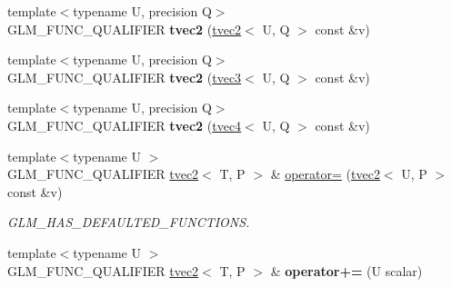 \begin{DoxyCompactItemize}
\item 
\hypertarget{structglm_1_1tvec2_a2d50495ed375c14e7dadde4dc3de82ba}{{\footnotesize template$<$typename U, precision Q$>$ }\\G\-L\-M\-\_\-\-F\-U\-N\-C\-\_\-\-Q\-U\-A\-L\-I\-F\-I\-E\-R {\bfseries tvec2} (\hyperlink{structglm_1_1tvec2}{tvec2}$<$ U, Q $>$ const \&v)}\label{structglm_1_1tvec2_a2d50495ed375c14e7dadde4dc3de82ba}

\item 
\hypertarget{structglm_1_1tvec2_a9742902fc6686c11ae142a5bbc8b9c58}{{\footnotesize template$<$typename U, precision Q$>$ }\\G\-L\-M\-\_\-\-F\-U\-N\-C\-\_\-\-Q\-U\-A\-L\-I\-F\-I\-E\-R {\bfseries tvec2} (\hyperlink{structglm_1_1tvec3}{tvec3}$<$ U, Q $>$ const \&v)}\label{structglm_1_1tvec2_a9742902fc6686c11ae142a5bbc8b9c58}

\item 
\hypertarget{structglm_1_1tvec2_abd8dda4cd25f53c5fcf6565f9689e1a4}{{\footnotesize template$<$typename U, precision Q$>$ }\\G\-L\-M\-\_\-\-F\-U\-N\-C\-\_\-\-Q\-U\-A\-L\-I\-F\-I\-E\-R {\bfseries tvec2} (\hyperlink{structglm_1_1tvec4}{tvec4}$<$ U, Q $>$ const \&v)}\label{structglm_1_1tvec2_abd8dda4cd25f53c5fcf6565f9689e1a4}

\item 
\hypertarget{structglm_1_1tvec2_af214e66acab4db6f5a539ff9a161e3ba}{{\footnotesize template$<$typename U $>$ }\\G\-L\-M\-\_\-\-F\-U\-N\-C\-\_\-\-Q\-U\-A\-L\-I\-F\-I\-E\-R \hyperlink{structglm_1_1tvec2}{tvec2}$<$ T, P $>$ \& \hyperlink{structglm_1_1tvec2_af214e66acab4db6f5a539ff9a161e3ba}{operator=} (\hyperlink{structglm_1_1tvec2}{tvec2}$<$ U, P $>$ const \&v)}\label{structglm_1_1tvec2_af214e66acab4db6f5a539ff9a161e3ba}

\begin{DoxyCompactList}\small\item\em G\-L\-M\-\_\-\-H\-A\-S\-\_\-\-D\-E\-F\-A\-U\-L\-T\-E\-D\-\_\-\-F\-U\-N\-C\-T\-I\-O\-N\-S. \end{DoxyCompactList}\item 
\hypertarget{structglm_1_1tvec2_a6c7476ec32ff4f21ace471d326a9be06}{{\footnotesize template$<$typename U $>$ }\\G\-L\-M\-\_\-\-F\-U\-N\-C\-\_\-\-Q\-U\-A\-L\-I\-F\-I\-E\-R \hyperlink{structglm_1_1tvec2}{tvec2}$<$ T, P $>$ \& {\bfseries operator+=} (U scalar)}\label{structglm_1_1tvec2_a6c7476ec32ff4f21ace471d326a9be06}


\end{DoxyCompactItemize}
